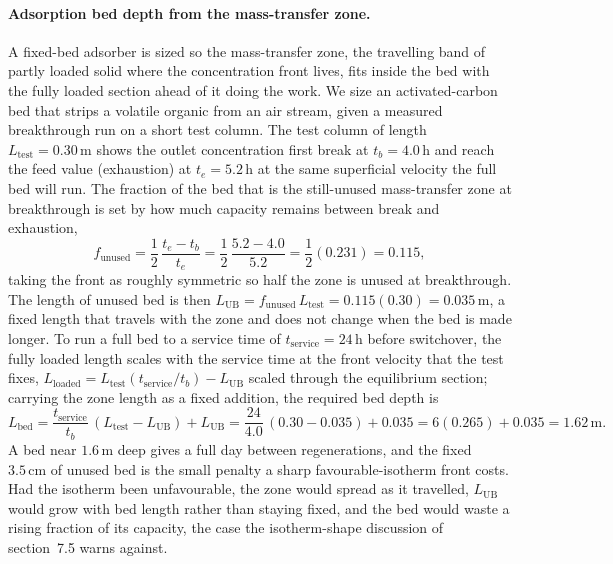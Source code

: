 \paragraph{Adsorption bed depth from the mass-transfer zone.} A fixed-bed
adsorber is sized so the mass-transfer zone, the travelling band of
partly loaded solid where the concentration front lives, fits inside the bed
with the fully loaded section ahead of it doing the work. We size an
activated-carbon bed that strips a volatile organic from an air stream, given
a measured breakthrough run on a short test column. The test column of length
$L_{\text{test}} = 0.30\,\text{m}$ shows the outlet concentration first
break at $t_b = 4.0\,\text{h}$ and reach the feed value (exhaustion) at
$t_e = 5.2\,\text{h}$ at the same superficial velocity the full bed will run.
The fraction of the bed that is the still-unused mass-transfer zone at
breakthrough is set by how much capacity remains between break and exhaustion,
\[
f_{\text{unused}} = \frac{1}{2}\,\frac{t_e - t_b}{t_e} =
\frac{1}{2}\,\frac{5.2 - 4.0}{5.2} = \frac{1}{2}(0.231) = 0.115,
\]
taking the front as roughly symmetric so half the zone is unused at
breakthrough. The length of unused bed is then $L_{\text{UB}} =
f_{\text{unused}}\,L_{\text{test}} = 0.115(0.30) = 0.035\,\text{m}$, a fixed
length that travels with the zone and does not change when the bed is made
longer. To run a full bed to a service time of $t_{\text{service}} =
24\,\text{h}$ before switchover, the fully loaded length scales with the
service time at the front velocity that the test fixes, $L_{\text{loaded}} =
L_{\text{test}}(t_{\text{service}}/t_b) - L_{\text{UB}}$ scaled through the
equilibrium section; carrying the zone length as a fixed addition, the
required bed depth is
\[
L_{\text{bed}} = \frac{t_{\text{service}}}{t_b}\,(L_{\text{test}} -
L_{\text{UB}}) + L_{\text{UB}} = \frac{24}{4.0}\,(0.30 - 0.035) + 0.035 =
6(0.265) + 0.035 = 1.62\,\text{m}.
\]
A bed near $1.6\,\text{m}$ deep gives a full day between regenerations, and
the fixed $3.5\,\text{cm}$ of unused bed is the small penalty a sharp
favourable-isotherm front costs. Had the isotherm been unfavourable, the zone
would spread as it travelled, $L_{\text{UB}}$ would grow with bed length
rather than staying fixed, and the bed would waste a rising fraction of its
capacity, the case the isotherm-shape discussion of section~7.5 warns against.

